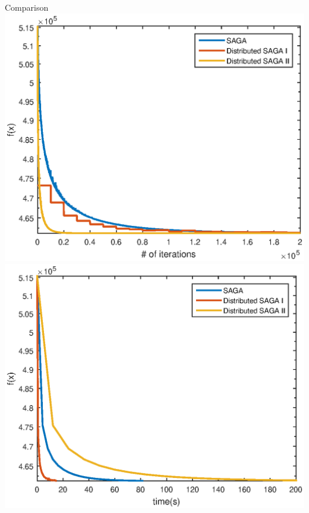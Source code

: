 \documentclass[11Pt,t,compress]{beamer}
\begin{document}
\begin{frame}{Comparison}
	\vfill
	\includegraphics[width=0.5\columnwidth]{figs/conv_iterations}
	\includegraphics[width=0.5\columnwidth]{figs/conv_time}
	\vfill
\end{frame}
\end{document}
